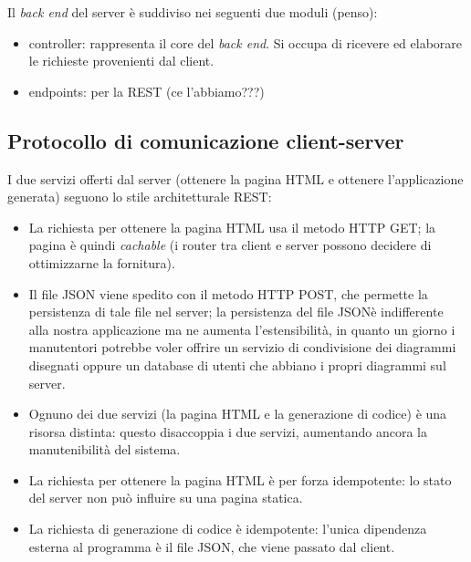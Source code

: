 Il \emph{back end} del server è suddiviso nei seguenti due moduli (penso):
\begin{itemize}
	\item controller: rappresenta il core del \emph{back end}. Si occupa di ricevere ed elaborare le richieste provenienti dal client.
	\item endpoints: per la REST (ce l'abbiamo???)
\end{itemize}



\subsection{Protocollo di comunicazione client-server} \label{sec:arch_proto}
I due servizi offerti dal server (ottenere la pagina HTML e ottenere l'applicazione generata) seguono lo stile architetturale REST:
\begin{itemize}
	\item La richiesta per ottenere la pagina HTML usa il metodo HTTP GET; la pagina è quindi \emph{cachable} (i router tra client e server possono decidere di ottimizzarne la fornitura).
	\item Il file JSON viene spedito con il metodo HTTP POST, che permette la persistenza di tale file nel server; la persistenza del file JSONè indifferente alla nostra applicazione ma ne aumenta l'estensibilità, in quanto un giorno i manutentori potrebbe voler offrire un servizio di condivisione dei diagrammi disegnati oppure un database di utenti che abbiano i propri diagrammi sul server.
	\item Ognuno dei due servizi (la pagina HTML e la generazione di codice) è una risorsa distinta: questo disaccoppia i due servizi, aumentando ancora la manutenibilità del sistema.
	\item La richiesta per ottenere la pagina HTML è per forza idempotente: lo stato del server non può influire su una pagina statica.
	\item La richiesta di generazione di codice è idempotente: l'unica dipendenza esterna al programma è il file JSON, che viene passato dal client.
\end{itemize}
